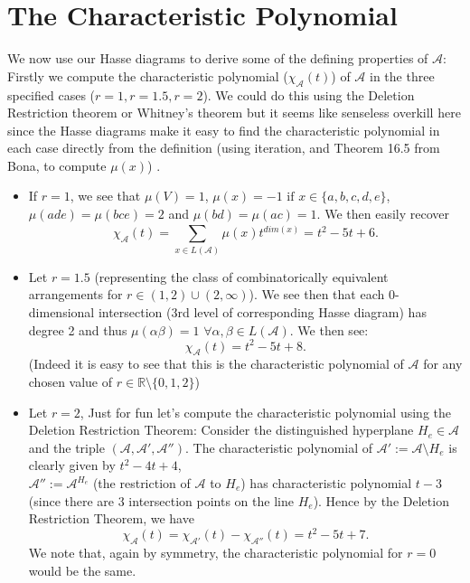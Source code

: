 \documentclass[12pt]{article}
\newcommand{\R}{\mathbb{R}}
\begin{document}
\section*{The Characteristic Polynomial}
We now use our Hasse diagrams to derive some of the defining properties of $\mathcal{A}$: \\
Firstly we compute the characteristic polynomial ($\chi_{\mathcal{A}}(t)$) of $\mathcal{A}$ in the three specified cases ($r=1,r=1.5,r=2$). We could do this using the Deletion Restriction theorem or Whitney's theorem but it seems like senseless overkill here since the Hasse diagrams make it easy to find the characteristic polynomial in each case directly from the definition (using iteration, and Theorem 16.5 from Bona, to compute $\mu (x)$) .  
\begin{itemize}
	\item If $r = 1$, we see that $\mu (V) = 1$, $\mu(x) = -1 \text{ if } x\in \{a,b,c,d,e\} $, $\mu (ade) = \mu (bce) = 2$ and $\mu (bd) = \mu (ac) = 1$. We then easily recover \[
			\chi_{\mathcal{A}}(t) = \sum_{x\in L(\mathcal{A})}^{} {\mu (x)t^{dim(x)}} = t^2-5t+6 
	.\]
\item Let $r=1.5$ (representing the class of combinatorically equivalent arrangements for  $r\in (1,2)\cup (2,\infty)$). We see then that each 0-dimensional intersection (3rd level of corresponding Hasse diagram) has degree 2 and thus $\mu (\alpha\beta) = 1$ $\forall \alpha,\beta\in L(\mathcal{A})$. We then see: \[
		\chi_{\mathcal{A}}(t) = t^2-5t+8
.\]  
(Indeed it is easy to see that this is the characteristic polynomial of $\mathcal{A}$ for any chosen value of $r\in \R\setminus\{0,1,2\}$)
	\item Let $r=2$, Just for fun let's compute the characteristic polynomial using the Deletion Restriction Theorem: Consider the distinguished hyperplane $H_e\in \mathcal{A}$ and the triple $(\mathcal{A}, \mathcal{A}', \mathcal{A}'')$. The characteristic polynomial of $\mathcal{A}' := \mathcal{A}\setminus H_e$ is clearly given by $t^2-4t+4$, \\
		$\mathcal{A}'':=\mathcal{A}^{H_e}$ (the restriction of $\mathcal{A}$ to $H_{e}$) has characteristic polynomial $t-3$ (since there are 3 intersection points on the line $H_e$). Hence by the Deletion Restriction Theorem, we have \[
			\chi_{\mathcal{A}}(t) = \chi_{\mathcal{A}'}(t) - \chi_{\mathcal{A}''}(t) = t^2-5t+7
		.\]
	We note that, again by symmetry, the characteristic polynomial for $r=0$ would be the same.
\end{itemize}
\end{document}
